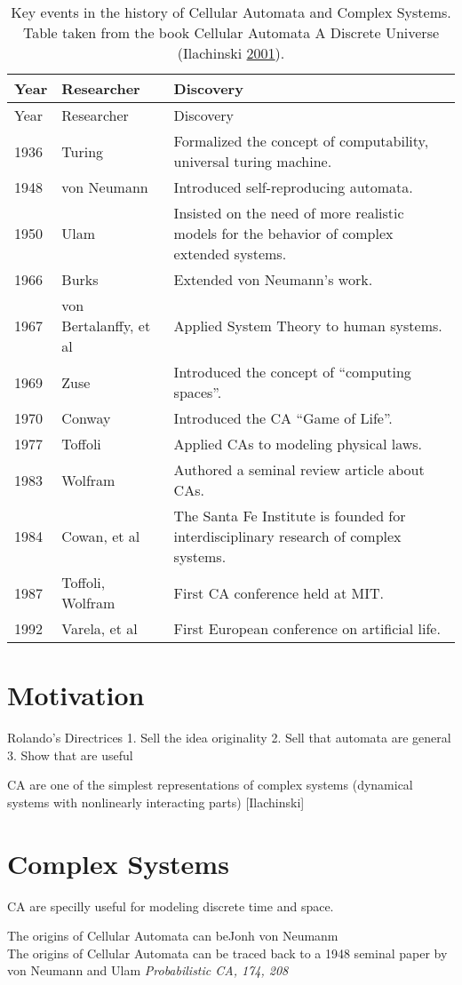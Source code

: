 \documentclass[
]{book}
\begin{document}
\begin{longtable}[]{@{}lll@{}}
\caption{Key events in the history of Cellular Automata and Complex Systems. Table taken from the book Cellular Automata A Discrete Universe (Ilachinski \protect\hyperlink{ref-ilachinski2001cellular}{2001}).}\tabularnewline
\toprule
Year & Researcher & Discovery\tabularnewline
\midrule
\endfirsthead
\toprule
Year & Researcher & Discovery\tabularnewline
\midrule
\endhead
1936 & Turing & Formalized the concept of computability, universal turing machine.\tabularnewline
1948 & von Neumann & Introduced self-reproducing automata.\tabularnewline
1950 & Ulam & Insisted on the need of more realistic models for the behavior of complex extended systems.\tabularnewline
1966 & Burks & Extended von Neumann's work.\tabularnewline
1967 & von Bertalanffy, et al & Applied System Theory to human systems.\tabularnewline
1969 & Zuse & Introduced the concept of ``computing spaces''.\tabularnewline
1970 & Conway & Introduced the CA ``Game of Life''.\tabularnewline
1977 & Toffoli & Applied CAs to modeling physical laws.\tabularnewline
1983 & Wolfram & Authored a seminal review article about CAs.\tabularnewline
1984 & Cowan, et al & The Santa Fe Institute is founded for interdisciplinary research of complex systems.\tabularnewline
1987 & Toffoli, Wolfram & First CA conference held at MIT.\tabularnewline
1992 & Varela, et al & First European conference on artificial life.\tabularnewline
\bottomrule
\end{longtable}

\hypertarget{motivation}{%
\section{Motivation}\label{motivation}}

Rolando's Directrices
1. Sell the idea originality
2. Sell that automata are general
3. Show that are useful

CA are one of the simplest representations of
complex systems (dynamical systems with nonlinearly interacting parts)
{[}Ilachinski{]}

\hypertarget{complex-systems}{%
\section{Complex Systems}\label{complex-systems}}

CA are specilly useful for modeling discrete time and space.

The origins of Cellular Automata can beJonh von Neumanm\\
The origins of Cellular Automata can be traced back to
a 1948 seminal paper by von Neumann and Ulam \emph{Probabilistic CA, 174, 208}
\end{document}
